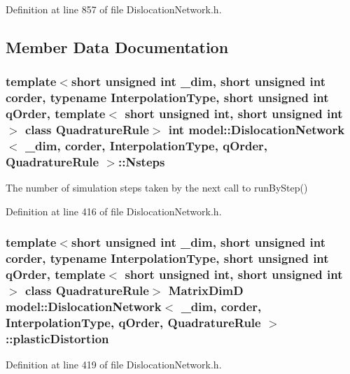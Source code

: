 Definition at line 857 of file Dislocation\+Network.\+h.



\subsection{Member Data Documentation}
\hypertarget{classmodel_1_1_dislocation_network_aa4e8518a5f4523613bb43000a1d935ea}{}
\subsubsection[{Nsteps}]{\setlength{\rightskip}{0pt plus 5cm}template$<$short unsigned int \+\_\+dim, short unsigned int corder, typename Interpolation\+Type, short unsigned int q\+Order, template$<$ short unsigned int, short unsigned int $>$ class Quadrature\+Rule$>$ int {\bf model\+::\+Dislocation\+Network}$<$ \+\_\+dim, corder, Interpolation\+Type, q\+Order, Quadrature\+Rule $>$\+::Nsteps}\label{classmodel_1_1_dislocation_network_aa4e8518a5f4523613bb43000a1d935ea}


The number of simulation steps taken by the next call to run\+By\+Step() 



Definition at line 416 of file Dislocation\+Network.\+h.

\hypertarget{classmodel_1_1_dislocation_network_aaad0e5eca7213651bb2d7bf5b87912ba}{}
\subsubsection[{plastic\+Distortion}]{\setlength{\rightskip}{0pt plus 5cm}template$<$short unsigned int \+\_\+dim, short unsigned int corder, typename Interpolation\+Type, short unsigned int q\+Order, template$<$ short unsigned int, short unsigned int $>$ class Quadrature\+Rule$>$ {\bf Matrix\+Dim\+D} {\bf model\+::\+Dislocation\+Network}$<$ \+\_\+dim, corder, Interpolation\+Type, q\+Order, Quadrature\+Rule $>$\+::plastic\+Distortion}\label{classmodel_1_1_dislocation_network_aaad0e5eca7213651bb2d7bf5b87912ba}


Definition at line 419 of file Dislocation\+Network.\+h.

